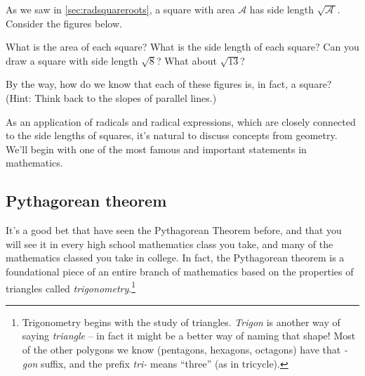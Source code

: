 \begin{boxedexplore}
As we saw in \cref{sec:radsquareroots}, a square with area $\mathcal{A}$ has side length $\sqrt{\!\mathcal{A}\,}$. Consider the figures below.

\begin{center}
\end{center}

What is the area of each square? What is the side length of each square? Can you draw a square with side length $\sqrt{8}$? What about $\sqrt{13}$?

By the way, how do we know that each of these figures is, in fact, a square? (Hint: Think back to the slopes of parallel lines.)
\end{boxedexplore}

As an application of radicals and radical expressions, which are closely connected to the side lengths of squares, it's natural to discuss concepts from geometry. We'll begin with one of the most famous and important statements in mathematics.

\subsection{{P}ythagorean theorem}

It's a good bet that have seen the Pythagorean Theorem before, and that you will see it in every high school mathematics class you take, and many of the mathematics classed you take in college. In fact, the Pythagorean theorem is a foundational piece of an entire branch of mathematics based on the properties of triangles called \textit{trigonometry}.\footnote{Trigonometry begins with the study of triangles. \textit{Trigon} is another way of saying \textit{triangle} -- in fact it might be a better way of naming that shape! Most of the other polygons we know (pentagons, hexagons, octagons) have that \textit{-gon} suffix, and the prefix \textit{tri-} means ``three'' (as in tricycle).}

